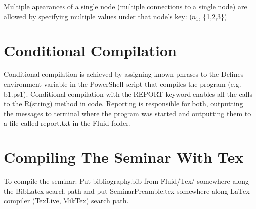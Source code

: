 Multiple apearances of a single node (multiple connections to a single node) are allowed by specifying multiple values under that node's key: ($n_1$, \{1,2,3\})

\section{Conditional Compilation}

Conditional compilation is achieved by assigning known phrases to the Defines environment variable in the PowerShell script that compiles the program (e.g. b1.ps1). Conditional compilation with the REPORT keyword enables all the calls to the R(string) method in code. Reporting is responsible for both, outputting the messages to terminal where the program was started and outputting them to a file called report.txt in the Fluid folder.

\section{Compiling The Seminar With Tex}

To compile the seminar: Put bibliography.bib from Fluid/Tex/ somewhere along the BibLatex search path and put SeminarPreamble.tex somewhere along LaTex compiler (TexLive, MikTex) search path.

